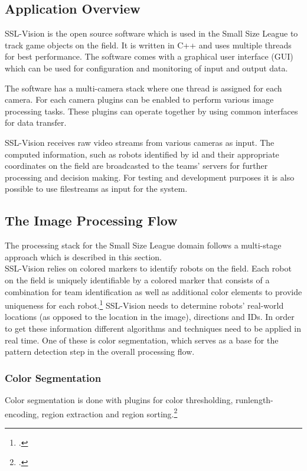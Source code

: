 \subsection{Application Overview \label{sec:ssl-overview}}
SSL-Vision is the open source software which is used in the Small Size League to
track game objects on the field. It is written in C++ and uses multiple threads
for best performance. The software comes with a graphical user interface (GUI)
which can be used for configuration and monitoring of input and output data.

The software has a multi-camera stack where one thread is assigned for each camera.
For each camera plugins can be enabled to perform various image processing
tasks. These plugins can operate together by using common interfaces for data
transfer.

SSL-Vision receives raw video streams from various cameras as input. The
computed information, such as robots identified by id and their appropriate
coordinates on the field are broadcasted to the teams' servers for further
processing and decision making. For testing and development purposes it is also
possible to use filestreams as input for the system.

\subsection{The Image Processing Flow}
The processing stack for the Small Size League domain follows a multi-stage
approach which is described in this section.\\
SSL-Vision relies on colored markers to identify robots on the field.
Each robot on the field is uniquely identifiable by a colored marker that
consists of a combination for team identification as well as additional color
elements to provide uniqueness for each robot.\footcite[Cf.][5]{zickler_ssl_vision}
SSL-Vision needs to determine robots' real-world locations (as opposed to the
location in the image), directions and IDs.
In order to get these information different algorithms and techniques need to be
applied in real time. One of these is color segmentation, which serves as a 
base for the pattern detection step in the overall processing flow.


\subsubsection{Color Segmentation}
Color segmentation is done with plugins for color thresholding, runlength-encoding,
region extraction and region sorting.\footcite[Cf.][]{zickler_ssl_vision}

